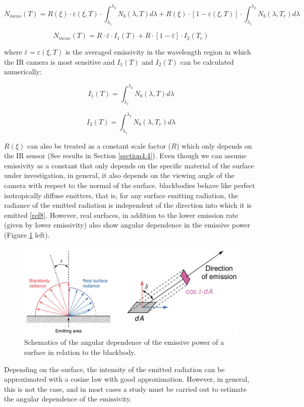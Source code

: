 		\begin{equation}\label{eq1.15}
			N_{meas}(T)= R(\xi) \cdot \varepsilon(\xi,T) \cdot \int_{\lambda_{1}}^{\lambda_{2}} N_{b}(\lambda,T) d\lambda + R(\xi) \cdot [1- \varepsilon(\xi,T)] \cdot \int_{\lambda_{1}}^{\lambda_{2}} N_{b}(\lambda,T_{r}) d\lambda
		\end{equation}	
		
		\begin{equation}\label{eq1.16}
			N_{meas}(T)= R \cdot \bar{\varepsilon} \cdot I_{1}(T) + R \cdot [1- \bar{\varepsilon}] \cdot I_{2}(T_{r})
		\end{equation}\bigskip
		
		where $\bar{\varepsilon}=\varepsilon(\xi,T)$ is the averaged emissivity in the wavelength region in which the IR camera is most sensitive and $I_{1}(T)$ and $I_{2}(T)$ can be calculated numerically:
		
		\begin{equation}\label{eq3.10}
			I_{1}(T)=\int_{\lambda_{1}}^{\lambda_{2}} N_{b}(\lambda,T) d\lambda
		\end{equation}
		
		\begin{equation}\label{eq3.11}
			I_{2}(T)=\int_{\lambda_{1}}^{\lambda_{2}} N_{b}(\lambda,T_{r}) d\lambda
		\end{equation}\bigskip
		
		$R(\xi)$ can also be treated as a constant scale factor ($R$) which only depends on the IR sensor (See results in Section \ref{section4.4}).
		Even though we can assume emissivity as a constant that only depends on the specific material of the surface under investigation, in general, it also depends on the viewing angle of the camera with respect to the normal of the surface. blackbodies behave like perfect isotropically diffuse emitters, that is, for any surface emitting radiation, the radiance of the emitted radiation is independent of the direction into which it is emitted \ref{ref8}. However, real surfaces, in addition to the lower emission rate (given by lower emissivity) also show angular dependence in the emissive power (Figure \ref{fig1.7} left).
		
		\begin{figure}[ht!]
			\centering
			\captionsetup{justification=centering,margin=2cm}
			\includegraphics[scale=0.35]{Figures/Chapter01/AngularDistributionSchematics.jpg}
			\caption{Schematics of the angular dependence of the emissive power of a surface in relation to the blackbody.}\label{fig1.7}
		\end{figure}
		
		Depending on the surface, the intensity of the emitted radiation can be approximated with a cosine law with good approximation. However, in general, this is not the case, and in most cases a study must be carried out to estimate the angular dependence of the emissivity.
		
